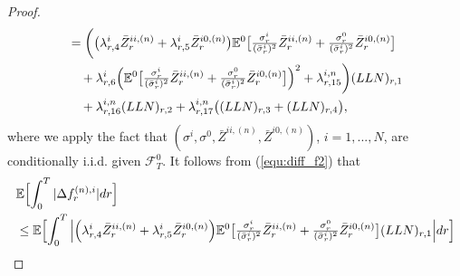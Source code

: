 \documentclass[10pt,a4paper]{amsart}
\newcommand{\MF}{{\mathcal{F}}}
\begin{document}
\begin{proof}
\begin{align}
&= \biggl(\bigl(\lambda_{r,4}^{i}\bar{Z}_{r}^{ii,(n)} + \lambda_{r,5}^{i}\bar{Z}_{r}^{i0,(n)}\bigr)\mathbb{E}^{0}\bigl[\tfrac{\sigma_{r}^{i}}{(\bar{\sigma}_{r}^{i})^{2}}\bar{Z}_{r}^{ii,(n)}+\tfrac{\sigma_{r}^{0}}{(\bar{\sigma}_{r}^{i})^{2}}\bar{Z}_{r}^{i0,(n)}\bigr] \nonumber \\ &\ \ \ +\lambda_{r,6}^{i}\Bigl(\mathbb{E}^{0}\bigl[\tfrac{\sigma_{r}^{i}}{(\bar{\sigma}_{r}^{i})^{2}}\bar{Z}_{r}^{ii,(n)}+\tfrac{\sigma_{r}^{0}}{(\bar{\sigma}_{r}^{i})^{2}}\bar{Z}_{r}^{i0,(n)}\bigr]\Bigr)^{2}+\lambda_{r,15}^{i,n}\biggr)(LLN)_{r,1} \nonumber \\
&\ \ \ + \lambda_{r,16}^{i,n}(LLN)_{r,2} + \lambda_{r,17}^{i,n}\bigl((LLN)_{r,3} + (LLN)_{r,4}\bigr) \label{equ:diff_f2},
\end{align}
where we apply the fact that $( \sigma^i, \sigma^0,  \bar{Z}^{ii, (n)}, \bar{Z}^{i0, (n)} )$, $i=1,...,N$, are conditionally i.i.d. given $\MF^0_T$.
It follows from (\ref{equ:diff_f2}) that
\begin{align}
&\mathbb{E}\Bigl[\int_{0}^{T}|\Delta f_{r}^{(n),i}|dr\Bigr] \nonumber \\
&\leq \mathbb{E}\Bigl[\int_{0}^{T}\Big|\Bigl(\lambda_{r,4}^{i}\bar{Z}_{r}^{ii,(n)} + \lambda_{r,5}^{i}\bar{Z}_{r}^{i0,(n)}\Bigr)\mathbb{E}^{0}\bigl[\tfrac{\sigma_{r}^{i}}{(\bar{\sigma}_{r}^{i})^{2}}\bar{Z}_{r}^{ii,(n)}+\tfrac{\sigma_{r}^{0}}{(\bar{\sigma}_{r}^{i})^{2}}\bar{Z}_{r}^{i0,(n)}\bigr](LLN)_{r,1}\Big|dr\Bigr] \nonumber \\

\end{align}
\end{proof}
\end{document}
